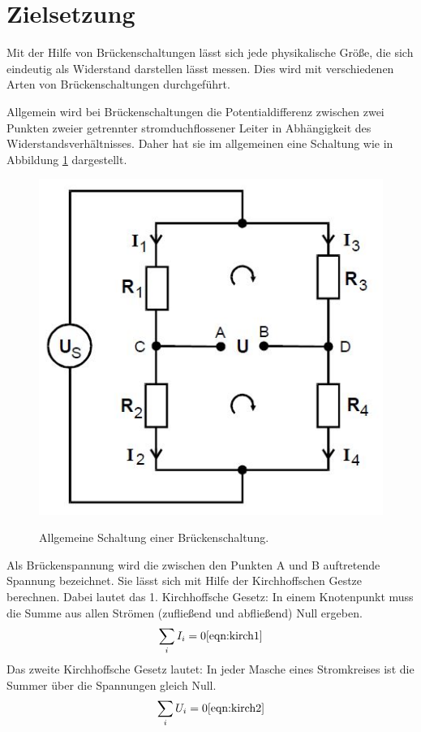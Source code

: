 \section{Zielsetzung}
Mit der Hilfe von Brückenschaltungen lässt sich jede physikalische Größe, die sich
eindeutig als Widerstand darstellen lässt messen.
Dies wird mit verschiedenen Arten von Brückenschaltungen durchgeführt.

Allgemein wird bei Brückenschaltungen die Potentialdifferenz zwischen zwei
Punkten zweier getrennter stromduchflossener Leiter in Abhängigkeit des
Widerstandsverhältnisses. Daher hat sie im allgemeinen eine Schaltung wie in
Abbildung \ref{fig:allg} dargestellt.
\begin{figure}[H]
  \centering
  \includegraphics{allg.JPG}
  \caption{Allgemeine Schaltung einer Brückenschaltung.}
  \label{fig:allg}
  \cite{skript}
\end{figure}
Als Brückenspannung wird die zwischen den Punkten A und B auftretende Spannung
bezeichnet. Sie lässt sich mit Hilfe der Kirchhoffschen Gestze berechnen.
Dabei lautet das 1. Kirchhoffsche Gesetz: In einem Knotenpunkt muss die
Summe aus allen Strömen (zufließend und abfließend) Null ergeben.
\begin{equation}
  \sum_{i} I_{i} = 0
  \ref{eqn:kirch1}
\end{equation}
Das zweite Kirchhoffsche Gesetz lautet: In jeder Masche eines Stromkreises
ist die Summer über die Spannungen gleich Null.
\begin{equation}
  \sum_{i} U_{i} =0
  \ref{eqn:kirch2}
\end{equation}

